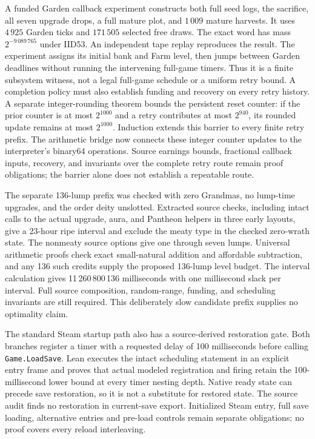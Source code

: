 \documentclass[11pt,a4paper]{article}
\numberwithin{equation}{section}
\theoremstyle{definition}
\theoremstyle{remark}
\begin{document}
A funded Garden callback experiment constructs both full seed logs, the sacrifice, all seven upgrade drops, a full mature plot, and $1\,009$ mature harvests. It uses $4\,925$ Garden ticks and $171\,505$ selected free draws. The exact word has mass $2^{-9\,089\,765}$ under IID53. An independent tape replay reproduces the result. The experiment assigns its initial bank and Farm level, then jumps between Garden deadlines without running the intervening full-game timers. Thus it is a finite subsystem witness, not a legal full-game schedule or a uniform retry bound. A completion policy must also establish funding and recovery on every retry history. A separate integer-rounding theorem bounds the persistent reset counter: if the prior counter is at most $2^{1000}$ and a retry contributes at most $2^{940}$, its rounded update remains at most $2^{1000}$. Induction extends this barrier to every finite retry prefix. The arithmetic bridge now connects these integer counter updates to the interpreter's binary64 operations. Source earnings bounds, fractional callback inputs, recovery, and invariants over the complete retry route remain proof obligations; the barrier alone does not establish a repeatable route.


The separate 136-lump prefix was checked with zero Grandmas, no lump-time upgrades, and the order deity unslotted. Extracted source checks, including intact calls to the actual upgrade, aura, and Pantheon helpers in three early layouts, give a 23-hour ripe interval and exclude the meaty type in the checked zero-wrath state. The nonmeaty source options give one through seven lumps. Universal arithmetic proofs check exact small-natural addition and affordable subtraction, and any 136 such credits supply the proposed 136-lump level budget. The interval calculation gives 11\,260\,800\,136 milliseconds with one millisecond slack per interval. Full source composition, random-range, funding, and scheduling invariants are still required. This deliberately slow candidate prefix supplies no optimality claim.

The standard Steam startup path also has a source-derived restoration gate. Both branches register a timer with a requested delay of 100 milliseconds before calling \texttt{Game.LoadSave}. Lean executes the intact scheduling statement in an explicit entry frame and proves that actual modeled registration and firing retain the 100-millisecond lower bound at every timer nesting depth. Native ready state can precede save restoration, so it is not a substitute for restored state. The source audit finds no restoration in current-save export. Initialized Steam entry, full save loading, alternative entries and pre-load controls remain separate obligations; no proof covers every reload interleaving.
\end{document}
